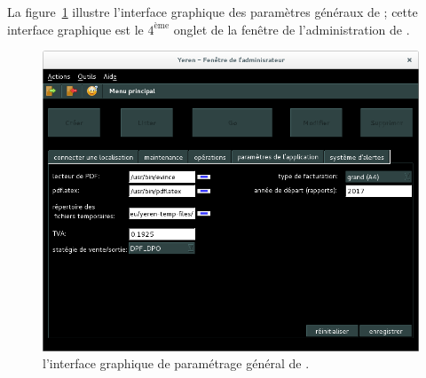 

La figure~\ref{fig:yeren-parametres} illustre l'interface
graphique des param\`etres g\'en\'eraux de \yeren;
cette interface graphique est le $4^{\text{\`eme}}$
onglet de la fen\^etre de l'administration de \yeren.

\begin{figure}[!htpb]
	\centering
	\includegraphics[scale=0.45]{images/yeroth-administration-parametres-generaux.png}
	\caption{l'interface graphique de param\'etrage g\'en\'eral
		de \yeren.}\label{fig:yeren-parametres}
\end{figure}

